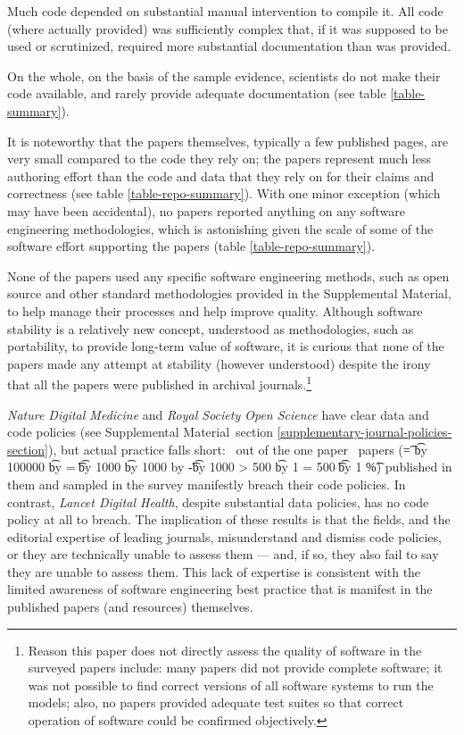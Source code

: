 \documentclass[10pt,letterpaper]{article}
\def\pc#1#2{\t = #1%
\multiply \t by 100000%
\divide \t by #2%
\tu = \t
\divide \t by 1000%
\multiply \t by 1000%
\advance \tu by -\t%
\divide \t by 1000\relax%
\ifnum \tu > 500 %
	\advance \t by 1 
\else
	\ifnum \tu = 500 
		\ifodd \t %
			\advance \t by 1
		\else %
		\fi
	\fi
\fi
\the\t\%}
\def\plural#1#2{\ifnum #1=1 
	one #2%
\else
	\the#1\ #2s%
\fi}
\def\supplement{Supplemental Material}
\begin{document}
Much code depended on substantial manual intervention to compile it. All code (where actually provided) was sufficiently complex that, if it was supposed to be used or scrutinized, required more substantial documentation than was provided.

On the whole, on the basis of the sample evidence, scientists do not make their code available, and rarely provide adequate documentation (see table \ref{table-summary}). 

It is noteworthy that the papers themselves, typically a few published pages, are very small compared to the code they rely on; the papers represent much less authoring effort than the code and data that they rely on for their claims and correctness (see table \ref{table-repo-summary}). With one minor exception (which may have been accidental), no papers reported anything on any software engineering methodologies, which is astonishing given the scale of some of the software effort supporting the papers (table \ref{table-repo-summary}). 

None of the papers used any specific software engineering methods, such as open source \cite{open-source} and other standard methodologies provided in the \supplement, to help manage their processes and help improve quality. Although software stability \cite{stability} is a relatively new concept, understood as methodologies, such as portability, to provide long-term value of software, it is curious that none of the papers made any attempt at stability (however understood) despite the irony that all the papers were published in archival journals.\footnote{Reason this paper does not directly assess the quality of software in the surveyed papers include: many papers did not provide complete software; it was not possible to find correct versions of all software systems to run the models; also, no papers provided adequate test suites so that correct operation of software could be confirmed objectively.}

\emph{Nature Digital Medicine\/} and \emph{Royal Society Open Science\/} have clear data and code policies (see \supplement\ section \ref{supplementary-journal-policies-section}), but actual practice falls short: \the\countHasBreach\ out of the \plural{\countHasPolicy}{paper} (\pc{\countHasBreach}{\countHasPolicy}) published in them and sampled in the survey manifestly breach their code policies. In contrast, \emph{Lancet Digital Health\/}, despite substantial data policies, has no code policy at all to breach. The implication of these results is that the fields, and the editorial expertise of leading journals, misunderstand and dismiss code policies, or they are technically unable to assess them --- and, if so, they also fail to say they are unable to assess them. This lack of expertise is consistent with the limited awareness of software engineering best practice that is manifest in the published papers (and resources) themselves.
\end{document}
